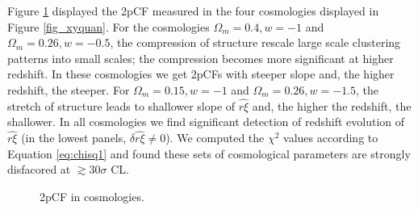 \documentclass[iop]{emulateapj}
\begin{document}
Figure \ref{fig_cosmo} displayed the 2pCF measured in the four cosmologies displayed in Figure \ref{fig_xyquan}.
For the cosmologies $\Omega_m=0.4,w=-1$ and $\Omega_m=0.26,w=-0.5$,
the compression of structure rescale large scale clustering patterns into small scales;
the compression becomes more significant at higher redshift.
In these cosmologies we get 2pCFs with steeper slope and, the higher redshift, the steeper.
For $\Omega_m=0.15,w=-1$ and $\Omega_m=0.26,w=-1.5$,
the stretch of structure leads to shallower slope of $\hat{r\xi}$ and, the higher the redshift, the shallower.
In all cosmologies we find significant detection of redshift evolution of $\hat{r\xi}$ (in the lowest panels, $\delta \hat{r\xi}\neq0$).
We computed the $\chi^2$ values according to Equation \ref{eq:chisq1} and found these sets of cosmological parameters are strongly disfacored 
at $\gtrsim30\sigma$ CL.


\begin{figure}
   \caption{\label{fig_cosmo}
   2pCF in cosmologies.
   }
\end{figure}
\end{document}
